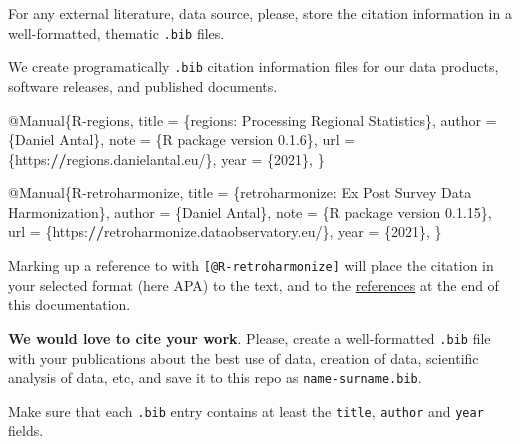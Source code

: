 \documentclass[
  fontsize=13pt,
  english,
  a4paper,
  openany, a4paper, oneside]{book}
\newenvironment{Shaded}{\begin{snugshade}}{\end{snugshade}}
\newcommand{\DecValTok}[1]{\textcolor[rgb]{0.00,0.00,0.81}{#1}}
\newcommand{\ErrorTok}[1]{\textcolor[rgb]{0.64,0.00,0.00}{\textbf{#1}}}
\newcommand{\FloatTok}[1]{\textcolor[rgb]{0.00,0.00,0.81}{#1}}
\newcommand{\NormalTok}[1]{#1}
\newcommand{\OtherTok}[1]{\textcolor[rgb]{0.56,0.35,0.01}{#1}}
\newcommand{\SpecialCharTok}[1]{\textcolor[rgb]{0.00,0.00,0.00}{#1}}
\begin{document}
For any external literature, data source, please, store the citation information in a well-formatted, thematic \texttt{.bib} files.

We create programatically \texttt{.bib} citation information files for our data products, software releases, and published documents.

\begin{Shaded}
\begin{Highlighting}[]
\SpecialCharTok{@}\NormalTok{Manual\{R}\SpecialCharTok{{-}}\NormalTok{regions,}
\NormalTok{  title }\OtherTok{=}\NormalTok{ \{regions}\SpecialCharTok{:}\NormalTok{ Processing Regional Statistics\},}
\NormalTok{  author }\OtherTok{=}\NormalTok{ \{Daniel Antal\},}
\NormalTok{  note }\OtherTok{=}\NormalTok{ \{R package version }\DecValTok{0}\NormalTok{.}\FloatTok{1.6}\NormalTok{\},}
\NormalTok{  url }\OtherTok{=}\NormalTok{ \{https}\SpecialCharTok{:}\ErrorTok{//}\NormalTok{regions.danielantal.eu}\SpecialCharTok{/}\NormalTok{\},}
\NormalTok{  year }\OtherTok{=}\NormalTok{ \{}\DecValTok{2021}\NormalTok{\},}
\NormalTok{\}}

\SpecialCharTok{@}\NormalTok{Manual\{R}\SpecialCharTok{{-}}\NormalTok{retroharmonize,}
\NormalTok{  title }\OtherTok{=}\NormalTok{ \{retroharmonize}\SpecialCharTok{:}\NormalTok{ Ex Post Survey Data Harmonization\},}
\NormalTok{  author }\OtherTok{=}\NormalTok{ \{Daniel Antal\},}
\NormalTok{  note }\OtherTok{=}\NormalTok{ \{R package version }\DecValTok{0}\NormalTok{.}\FloatTok{1.15}\NormalTok{\},}
\NormalTok{  url }\OtherTok{=}\NormalTok{ \{https}\SpecialCharTok{:}\ErrorTok{//}\NormalTok{retroharmonize.dataobservatory.eu}\SpecialCharTok{/}\NormalTok{\},}
\NormalTok{  year }\OtherTok{=}\NormalTok{ \{}\DecValTok{2021}\NormalTok{\},}
\NormalTok{\}}
\end{Highlighting}
\end{Shaded}

Marking up a reference to \citep{R-retroharmonize} with \texttt{{[}@R-retroharmonize{]}} will place the citation in your selected format (here APA) to the text, and to the \protect\hyperlink{references}{references} at the end of this documentation.

\textbf{We would love to cite your work}. Please, create a well-formatted \texttt{.bib} file with your publications about the best use of data, creation of data, scientific analysis of data, etc, and save it to this repo as \texttt{name-surname.bib}.

Make sure that each \texttt{.bib} entry contains at least the \texttt{title}, \texttt{author} and \texttt{year} fields.
\end{document}
